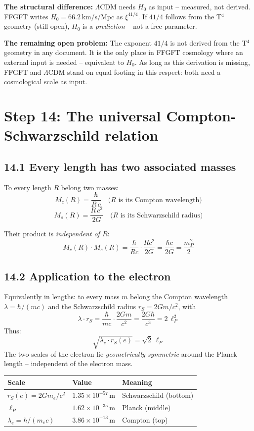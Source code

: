 \textbf{The structural difference:}
$\Lambda$CDM needs $H_0$ as input -- measured, not derived.
FFGFT writes $H_0 = 66{.}2$\,km/s/Mpc as $\xi^{41/4}$.
If $41/4$ follows from the T$^4$ geometry (still open),
$H_0$ is a \emph{prediction} -- not a free parameter.

\textbf{The remaining open problem:}
The exponent $41/4$ is not derived from the T$^4$ geometry in any
document. It is the only place in FFGFT cosmology where an external
input is needed -- equivalent to $H_0$.
As long as this derivation is missing, FFGFT and $\Lambda$CDM stand
on equal footing in this respect: both need a cosmological scale
as input.

\section{Step 14: The universal Compton-Schwarzschild relation}

\subsection*{14.1 Every length has two associated masses}

To every length $R$ belong two masses:
\[
  M_c(R) = \frac{\hbar}{R\,c}
  \quad\text{(}R\text{ is its Compton wavelength)}
\]
\[
  M_s(R) = \frac{R\,c^2}{2G}
  \quad\text{(}R\text{ is its Schwarzschild radius)}
\]

Their product is \emph{independent of $R$}:
\[
  \boxed{M_c(R)\cdot M_s(R)
  = \frac{\hbar}{Rc}\cdot\frac{Rc^2}{2G}
  = \frac{\hbar c}{2G}
  = \frac{m_P^2}{2}}
\]

\subsection*{14.2 Application to the electron}

Equivalently in lengths: to every mass $m$ belong the Compton
wavelength $\lambda = \hbar/(mc)$ and the Schwarzschild radius
$r_S = 2Gm/c^2$, with
\[
  \lambda \cdot r_S = \frac{\hbar}{mc}\cdot\frac{2Gm}{c^2}
  = \frac{2G\hbar}{c^3} = 2\,\ell_P^2
\]
Thus:
\[
  \sqrt{\lambda_e \cdot r_S(e)} = \sqrt{2}\,\ell_P
\]
The two scales of the electron lie \emph{geometrically symmetric}
around the Planck length -- independent of the electron mass.

\begin{center}
\begin{tabular}{lll}
\toprule
\textbf{Scale} & \textbf{Value} & \textbf{Meaning} \\
\midrule
$r_S(e) = 2Gm_e/c^2$ & $1{.}35\times10^{-57}$\,m & Schwarzschild (bottom) \\
$\ell_P$ & $1{.}62\times10^{-35}$\,m & Planck (middle) \\
$\lambda_e = \hbar/(m_e c)$ & $3{.}86\times10^{-13}$\,m & Compton (top) \\
\bottomrule
\end{tabular}
\end{center}


